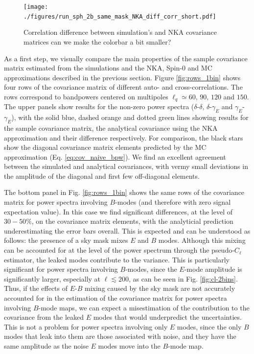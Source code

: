 \documentclass[a4paper,11pt]{article}
\newcommand{\red}[1]{{\color{red} #1}}
\begin{document}
      \begin{figure}
        \centering
        \texttt{[image: ./figures/run\_sph\_2b\_same\_mask\_NKA\_diff\_corr\_short.pdf]}
        \caption{Correlation difference between simulation's and NKA covariance matrices \red{can we make the colorbar a bit smaller?}}
        \label{fig:corr_diff_2bins}
      \end{figure}
      As a first step, we visually compare the main properties of the sample covariance matrix estimated from the simulations and the NKA, Spin-0 and MC approximations described in the previous section. Figure \ref{fig:rows_1bin} shows four rows of the covariance matrix of different auto- and cross-correlations. The rows correspond to bandpowers centered on multipoles $\ell_q\simeq60,\,90,\,120$ and $150$. The upper panels show results for the non-zero power spectra ($\delta$-$\delta$, $\delta$-$\gamma_E$ and $\gamma_E$-$\gamma_E$), with the solid blue, dashed orange and dotted green lines showing results for the sample covariance matrix, the analytical covariance using the NKA approximation and their difference respectively. For comparison, the black stars show the diagonal covariance matrix elements predicted by the MC approximation (Eq. \ref{eq:cov_naive_bpw}). We find an excellent agreement between the simulated and analytical covariances, with vermy small deviations in the amplitude of the diagonal and first few off-diagonal elements.
      
      The bottom panel in Fig. \ref{fig:rows_1bin} shows the same rows of the covariance matrix for power spectra involving $B$-modes (and therefore with zero signal expectation value). In this case we find significant differences, at the level of $30-50\%$, on the covariance matrix elements, with the analyticial prediction underestimating the error bars overall. This is expected and can be understood as follows: the presence of a sky mask mixes $E$ and $B$ modes. Although this mixing can be accounted for at the level of the power spectrum through the pseudo-$C_\ell$ estimator, the leaked modes contribute to the variance. This is particularly significant for power spectra involving $B$-modes, since the $E$-mode amplitude is significantly larger, especially at $\ell\lesssim200$, as can be seen in Fig. \ref{fig:cl-2bins}. Thus, if the effects of $E$-$B$ mixing caused by the sky mask are not accurately accounted for in the estimation of the covariance matrix for power spectra involving $B$-mode maps, we can expect a misestimation of the contribution to the covariance from the leaked $E$ modes that would underpredict the uncertainties. This is not a problem for power spectra involving only $E$ modes, since the only $B$ modes that leak into them are those associated with noise, and they have the same amplitude as the noise $E$ modes move into the $B$-mode map.
\end{document}

